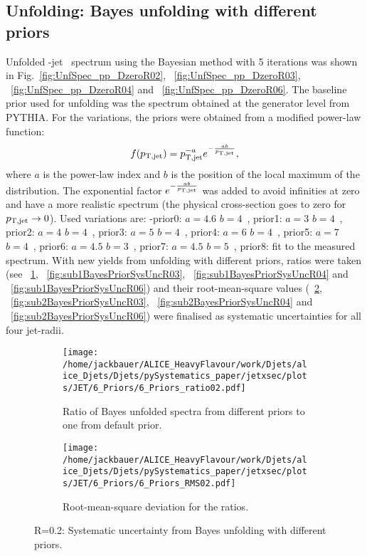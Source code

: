 \subsection{Unfolding: Bayes unfolding with different priors}
\label{sUnfoldSysBayesPrior}
Unfolded \Dzero-jet \pt\ spectrum using the Bayesian method with 5 iterations was shown in Fig.~\ref{fig:UnfSpec_pp_DzeroR02}, ~\ref{fig:UnfSpec_pp_DzeroR03}, ~\ref{fig:UnfSpec_pp_DzeroR04} and ~\ref{fig:UnfSpec_pp_DzeroR06}. The baseline prior used for unfolding was the spectrum obtained at the generator level from PYTHIA. For the variations, the priors were obtained from a modified power-law function: 
\begin{equation}
f(p_{\mathrm{T,jet}}) = p_{\mathrm{T,jet}}^{-a}e^{-\frac{ab}{p_{\mathrm{T,jet}}}},
\end{equation}
where $a$ is the power-law index and $b$ is the position of the local maximum of the distribution. The exponential factor $e^{-\frac{ab}{p_{\mathrm{T,jet}}}}$ was added to avoid infinities at zero and have a more realistic spectrum (the physical cross-section goes to zero for $p_{\mathrm{T,jet}} \to 0$).
Used variations are: -prior0: $a=4.6$ $b=4$~\GeVc, prior1: $a=3$ $b=4$~\GeVc, prior2: $a=4$ $b=4$~\GeVc, prior3: $a=5$ $b=4$~\GeVc, prior4: $a=6$ $b=4$~\GeVc, prior5: $a=7$ $b=4$~\GeVc, prior6: $a=4.5$ $b=3$~\GeVc, prior7: $a=4.5$ $b=5$~\GeVc, prior8: fit to the measured spectrum. With new yields from unfolding with different priors, ratios were taken (see ~\ref{fig:sub1BayesPriorSysUncR02},  ~\ref{fig:sub1BayesPriorSysUncR03},  ~\ref{fig:sub1BayesPriorSysUncR04} and ~\ref{fig:sub1BayesPriorSysUncR06}) and their root-mean-square values (~\ref{fig:sub2BayesPriorSysUncR02}, ~\ref{fig:sub2BayesPriorSysUncR03}, ~\ref{fig:sub2BayesPriorSysUncR04} and ~\ref{fig:sub2BayesPriorSysUncR06}) were finalised as systematic uncertainties for all four jet-radii.

\begin{figure}
\centering
\begin{subfigure}{.5\textwidth}
  \centering
  \texttt{[image: /home/jackbauer/ALICE\_HeavyFlavour/work/Djets/alice\_Djets/Djets/pySystematics\_paper/jetxsec/plots/JET/6\_Priors/6\_Priors\_ratio02.pdf]}
  \caption{Ratio of Bayes unfolded spectra from different priors to one from default prior.}
  \label{fig:sub1BayesPriorSysUncR02}
\end{subfigure}%
\begin{subfigure}{.5\textwidth}
  \centering
  \texttt{[image: /home/jackbauer/ALICE\_HeavyFlavour/work/Djets/alice\_Djets/Djets/pySystematics\_paper/jetxsec/plots/JET/6\_Priors/6\_Priors\_RMS02.pdf]}
  \caption{Root-mean-square deviation for the ratios.}
  \label{fig:sub2BayesPriorSysUncR02}
\end{subfigure}
\caption{R=0.2: Systematic uncertainty from Bayes unfolding with different priors.}
  \label{fig:BayesPriorSysUncR02}
\end{figure}

